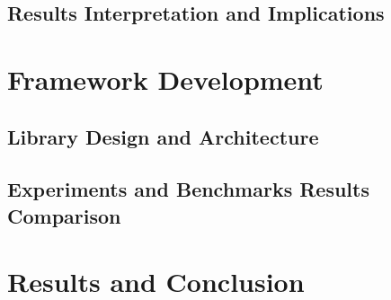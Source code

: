 \documentclass[a4paper,14pt]{extarticle}
\begin{document}
\subsection{Results Interpretation and Implications}

\section{Framework Development}

\subsection{Library Design and Architecture}
\subsection{Experiments and Benchmarks Results Comparison}

\section{Results and Conclusion}
\end{document}

